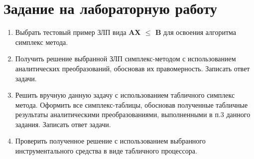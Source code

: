 \documentclass[a4paper,12pt]{article}
\begin{document}


\section{\normalsize{Задание на лабораторную работу}}
\begin{flushleft}
\justify
\begin{enumerate}
\item
  Выбрать тестовый пример ЗЛП вида \textbf{AX $\le$ B} для освоения алгоритма симплекс метода.
\item
  Получить решение выбранной ЗЛП симплекс-методом с использованием аналитических преобразований, обосновав их правомерность. Записать ответ задачи.
\item
  Решить вручную данную задачу с использованием табличного симплекс метода. Оформить все симплекс-таблицы, обосновав полученные табличные результаты аналитическими преобразованиями, выполненными в п.3 данного задания. Записать ответ задачи.
\item 
  Проверить полученное решение с использованием выбранного инструментального средства в виде табличного процессора.
\end{enumerate}
\end{flushleft}

\pagebreak
\end{document}
